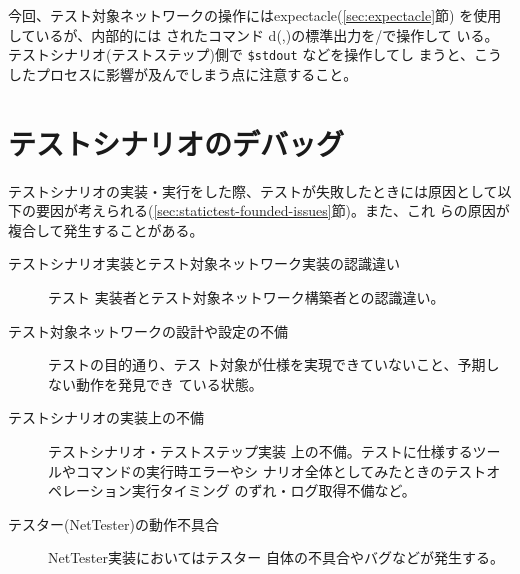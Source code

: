 今回、テスト対象ネットワークの操作にはexpectacle(\ref{sec:expectacle}節)
を使用しているが、内部的には  されたコマンド
d(,)の標準出力を/で操作して
いる。テストシナリオ(テストステップ)側で \verb|$stdout| などを操作してし
まうと、こうしたプロセスに影響が及んでしまう点に注意すること。


 \section{テストシナリオのデバッグ}

テストシナリオの実装・実行をした際、テストが失敗したときには原因として以
下の要因が考えられる(\ref{sec:statictest-founded-issues}節)。また、これ
らの原因が複合して発生することがある。
\begin{description}
 \item[テストシナリオ実装とテスト対象ネットワーク実装の認識違い] テスト
            実装者とテスト対象ネットワーク構築者との認識違い。
 \item[テスト対象ネットワークの設計や設定の不備] テストの目的通り、テス
            ト対象が仕様を実現できていないこと、予期しない動作を発見でき
            ている状態。
 \item[テストシナリオの実装上の不備] テストシナリオ・テストステップ実装
            上の不備。テストに仕様するツールやコマンドの実行時エラーやシ
            ナリオ全体としてみたときのテストオペレーション実行タイミング
            のずれ・ログ取得不備など。
 \item[テスター(NetTester)の動作不具合] NetTester実装においてはテスター
            自体の不具合やバグなどが発生する。
\end{description}



